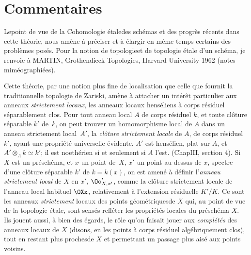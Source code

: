 \section[Commentaires]{Commentaires\protect\sfootnotemark} \label{XIII.6}

Le\pageoriginale point de vue de la \og Cohomologie \'etale\fg des sch\'emas et des progr\`es r\'ecents dans cette th\'eorie, nous am\`ene \`a pr\'eciser et \`a \'elargir en m\^eme temps certains des probl\`emes pos\'es. Pour la notion de \og topologie\fg et de \og topologie \'etale d'un sch\'ema\fg, je renvoie \`a M\ptbl ARTIN, Grothendieck Topologies, Harvard University 1962 (notes mim\'eographi\'ees).

Cette th\'eorie, par une notion plus fine de localisation que celle que fournit la traditionnelle \og topologie de Zariski\fg, am\`ene \`a attacher un int\'er\^et particulier aux anneaux \emph{strictement locaux}\label{pXIII.6}, \ie les anneaux locaux hens\'eliens \`a corps r\'esiduel s\'eparablement clos. Pour tout anneau local $A$ de corps r\'esiduel $k$, et toute cl\^{o}ture s\'eparable $k'$ de~$k$, on peut trouver un homomorphisme local de $A$ dans un anneau strictement local~$A'$, la \emph{cl\^{o}ture strictement locale} de $A$, de corps r\'esiduel $k'$, ayant une propri\'et\'e universelle \'evidente. $A'$ est hens\'elien, plat sur $A$, et $A'\otimes_A k\simeq k'$; il est noeth\'erien si et seulement si $A$ l'est. (\Cf \loccit Chap\ptbl III, section 4). Si $X$ est un pr\'esch\'ema, et $x$ un point de~$X$, $x'$ un point au-dessus de $x$, spectre d'une cl\^{o}ture s\'eparable $k'$ de $k=k(x)$, on est amen\'e \`a d\'efinir l'\emph{anneau strictement local} de $X$ en $x'$, $\Oo'_{X, x'}$, comme la cl\^{o}ture strictement locale de l'anneau local habituel $\OXx$, relativement \`a l'extension r\'esiduelle $K'/K$. Ce sont les anneaux \emph{strictement} locaux des points \og g\'eom\'etriques\fg de $X$ qui, au point de vue de la topologie \'etale, sont sens\'es refl\'eter les propri\'et\'es locales du pr\'esch\'ema $X$. Ils jouent aussi, \`a bien des \'egards, le r\^{o}le qu'on faisait jouer aux \emph{compl\'et\'es} des anneaux locaux de $X$ (disons, en les points \`a corps r\'esiduel alg\'ebriquement clos), tout en restant \og plus proches\fg de $X$ et permettant un passage plus ais\'e aux \og points voisins\fg.


